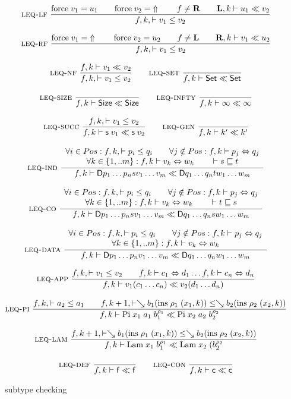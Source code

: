 \begin{figure}[p]
\begin{gather*}
\mbox{\sc leq-lf}\ \dfrac{\mathrm{force} \; v_1 = u_1 \qquad \mathrm{force} \; v_2 = \;\Uparrow 
\qquad
f \neq \mathbf{R} \qquad \mathbf{L},k\vdash u_1{\;\ll\;}v_2}{ f,k,\vdash v_1\leq v_2}
\\[2ex]
\mbox{\sc leq-rf}\ \dfrac{\mathrm{force} \; v_1 = \;\Uparrow \qquad \mathrm{force} \; v_2 = u_2 
\qquad
f \neq \mathbf{L} \qquad \mathbf{R},k\vdash v_1{\;\ll\;}u_2}{ f,k,\vdash v_1\leq v_2}
\\[2ex]
\mbox{\sc leq-nf}\ \dfrac{f,k\vdash v_1{\;\ll\;}v_2}{ f,k,\vdash v_1\leq v_2}
\qquad
\mbox{\sc leq-set}\ \dfrac{}{f,k\vdash\mathsf{Set}{\;\ll\;}\mathsf{Set}}
\\[2ex]
\mbox{\sc leq-size}\ \dfrac{}{f,k\vdash\mathsf{Size}{\;\ll\;}\mathsf{Size}}
\qquad
\mbox{\sc leq-infty}\ \dfrac{}{f,k\vdash\infty{\;\ll\;}\infty}
\\[2ex]
\mbox{\sc leq-succ}\ \dfrac{f,k,\vdash v_1\leq v_2}{f,k\vdash\mathsf{s}\; v_1{\;\ll\;}\mathsf{s}\; v_2}
\qquad
\mbox{\sc leq-gen}\ \dfrac{}{f,k\vdash k'{\;\ll\;}k'}
\\[2ex]
\mbox{\sc leq-ind}\ \dfrac{\begin{array}[b]{c}\forall i \in Pos: f,k,\vdash p_i\leq q_i 
\qquad
\forall j \notin Pos : f,k\vdash p_j\Leftrightarrow q_j 
\\\forall k \in \{1,..m\}:f,k\vdash v_k\Leftrightarrow w_k
\qquad
\vdash s\sqsubseteq t \end{array}}{f,k\vdash\mathsf{D} p_1 \ldots p_n s v_1 \ldots v_m{\;\ll\;}\mathsf{D} q_1 \ldots q_n t w_1 \ldots w_m}
\\[2ex]
\mbox{\sc leq-co}\ \dfrac{\begin{array}[b]{c}\forall i \in Pos: f,k,\vdash p_i\leq q_i 
\qquad
\forall j \notin Pos : f,k\vdash p_j\Leftrightarrow q_j\\\forall k \in \{1,..m\}:f,k\vdash v_k\Leftrightarrow w_k
\qquad
\vdash t\sqsubseteq s \end{array}}{f,k\vdash\mathsf{D} p_1 \ldots p_n s v_1 \ldots v_m{\;\ll\;}\mathsf{D} q_1 \ldots q_n s w_1 \ldots w_m}
\\[2ex]
\mbox{\sc leq-data}\ \dfrac{\begin{array}[b]{c}\forall i \in Pos: f,k,\vdash p_i\leq q_i 
\qquad
\forall j \notin Pos : f,k\vdash p_j\Leftrightarrow q_j\\\forall k \in \{1,..m\}:f,k\vdash v_k\Leftrightarrow w_k\end{array}}{f,k\vdash\mathsf{D} p_1 \ldots p_n v_1 \ldots v_m{\;\ll\;}\mathsf{D} q_1 \ldots q_n w_1 \ldots w_m}
\\[2ex]
\mbox{\sc leq-app}\ \dfrac{f,k,\vdash v_1\leq v_2 \qquad
f,k\vdash c_1\Leftrightarrow d_1 \ldots f,k\vdash c_n\Leftrightarrow d_n}{f,k\vdash v_1 (c_1 \ldots c_n){\;\ll\;}v_2 (d_1 \ldots d_n)}
\\[2ex]
\mbox{\sc leq-pi}\ \dfrac{f,k,\vdash a_2\leq a_1
\qquad
f,k+1,\vdash\searrow b_1 (\mathrm{ins} \; \rho_1 \; (x_1,k))\leq\searrow b_2 (\mathrm{ins} \; \rho_2 \; (x_2,k))}{f,k\vdash\mathrm{Pi} \; x_1 \; a_1 \; b_1^{\rho_1}{\;\ll\;}\mathrm{Pi} \; x_2 \; a_2 \; b_2^{\rho_2}}
\\[2ex]
\mbox{\sc leq-lam}\ \dfrac{f,k+1,\vdash\searrow b_1 (\mathrm{ins} \; \rho_1 \; (x_1,k))\leq\searrow b_2 (\mathrm{ins} \; \rho_2 \; (x_2,k))}{f,k\vdash\mathrm{Lam} \; x_1 \; b_1^{\rho_1}{\;\ll\;}\mathrm{Lam} \; x_2 \; (b_2^{\rho_2}}
\\[2ex]
\mbox{\sc leq-def}\ \dfrac{}{f,k\vdash\mathsf{f}{\;\ll\;}\mathsf{f}}
\qquad
\mbox{\sc leq-con}\ \dfrac{}{f,k\vdash\mathsf{c}{\;\ll\;}\mathsf{c}}
\end{gather*}
\caption{subtype checking}
\end{figure}


